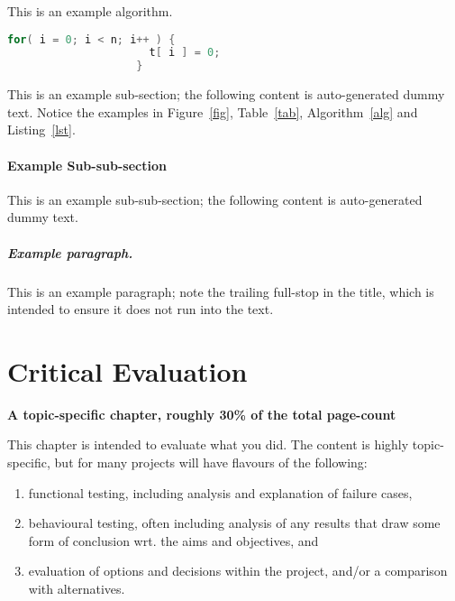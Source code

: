 \documentclass[ %
                    author={James Stephenson},
                supervisor={Dr. Edwin Simpson},
                    degree={MSc},
                     title={Bayesian Deep Learning For Extractive Test Summarisation},
                  subtitle={},
                      type={},
                      year={2023}]{dissertation}
\begin{document}
				\begin{algorithm}[t]
					\caption{This is an example algorithm.}
					\label{alg}
				\end{algorithm}
				
				\begin{lstlisting}[float={t},caption={This is an example listing.},label={lst},language=C]
					for( i = 0; i < n; i++ ) {
					  t[ i ] = 0;
					}
				\end{lstlisting}
				
				This is an example sub-section;
				the following content is auto-generated dummy text.
				Notice the examples in Figure~\ref{fig}, Table~\ref{tab}, Algorithm~\ref{alg}
				and Listing~\ref{lst}.
				\lipsum
				
				\subsubsection{Example Sub-sub-section}
				
					This is an example sub-sub-section;
					the following content is auto-generated dummy text.
					\lipsum
					
					\paragraph{Example paragraph.}
					
						This is an example paragraph; note the trailing full-stop in the title,
						which is intended to ensure it does not run into the text.
					
		
	\chapter{Critical Evaluation}
		\label{chap:evaluation}
		
		{\bf A topic-specific chapter, roughly 30\% of the total page-count} 
		\vspace{1cm} 
		
		\noindent
		This chapter is intended to evaluate what you did.  The content is highly 
		topic-specific, but for many projects will have flavours of the following:
		
		\begin{enumerate}
			\item functional  testing, including analysis and explanation of failure 
			      cases,
			\item behavioural testing, often including analysis of any results that 
			      draw some form of conclusion wrt. the aims and objectives,
			      and
			\item evaluation of options and decisions within the project, and/or a
			      comparison with alternatives.
		\end{enumerate}
		
\end{document}
